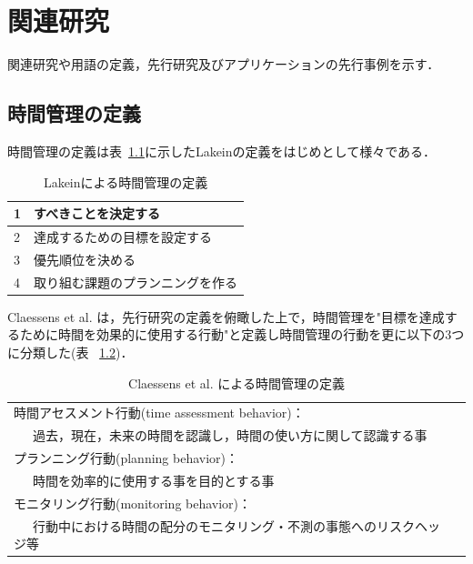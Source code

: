 \chapter{関連研究}
関連研究や用語の定義，先行研究及びアプリケーションの先行事例を示す．

\section{時間管理の定義}
時間管理の定義は表~\ref{tb:Lakein}に示したLakeinの定義\cite{Lakein1989}をはじめとして様々である．

\begin{table}[htb]
\begin{center}
  \begin{tabular}{|l|l|} \hline
   1 & すべきことを決定する \\ \hline
   2 & 達成するための目標を設定する \\ \hline
   3 & 優先順位を決める \\ \hline
   4 & 取り組む課題のプランニングを作る \\ \hline
  \end{tabular}
  \caption{Lakeinによる時間管理の定義}
  \label{tb:Lakein}
\end{center}
\end{table}

Claessens et al. は，先行研究の定義を俯瞰した上で，時間管理を"目標を達成するために時間を効果的に使用する行動"と定義し時間管理の行動を更に以下の3つに分類した\cite{Claessens2007}(表 ~\ref{tb:Claessens})．

\begin{table}[htb]
\begin{center}
  \begin{tabular}{|l|l|} \hline
   時間アセスメント行動(time assessment behavior)： \\ ~~~過去，現在，未来の時間を認識し，時間の使い方に関して認識する事 \\ \hline
   プランニング行動(planning behavior)：　\\  ~~~時間を効率的に使用する事を目的とする事 \\ \hline
   モニタリング行動(monitoring behavior)： \\ ~~~行動中における時間の配分のモニタリング・不測の事態へのリスクヘッジ等 \\ \hline
  \end{tabular}
  \caption{Claessens et al. による時間管理の定義}
  \label{tb:Claessens}
\end{center}
\end{table}

